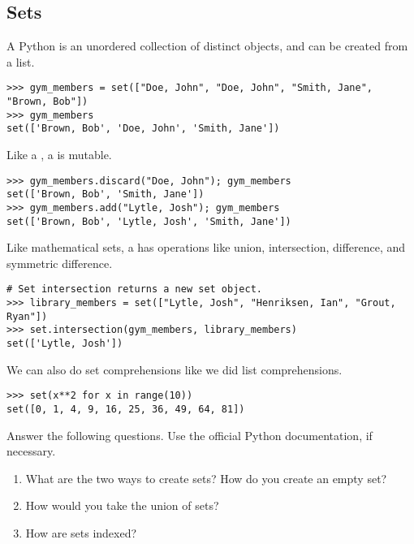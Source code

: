 \subsection*{Sets}
\begin{example}
A Python  is an unordered collection of distinct objects, and can be created from a list.
\begin{lstlisting}
>>> gym_members = set(["Doe, John", "Doe, John", "Smith, Jane", "Brown, Bob"])
>>> gym_members
set(['Brown, Bob', 'Doe, John', 'Smith, Jane'])
\end{lstlisting}
Like a , a  is mutable. 
\begin{lstlisting}
>>> gym_members.discard("Doe, John"); gym_members
set(['Brown, Bob', 'Smith, Jane'])
>>> gym_members.add("Lytle, Josh"); gym_members
set(['Brown, Bob', 'Lytle, Josh', 'Smith, Jane'])
\end{lstlisting}

Like mathematical sets, a  has operations like union, intersection, 
difference, and symmetric difference.

\begin{lstlisting}
# Set intersection returns a new set object.
>>> library_members = set(["Lytle, Josh", "Henriksen, Ian", "Grout, Ryan"])
>>> set.intersection(gym_members, library_members)
set(['Lytle, Josh'])
\end{lstlisting}

We can also do set comprehensions like we did list comprehensions.
\begin{lstlisting}
>>> set(x**2 for x in range(10))
set([0, 1, 4, 9, 16, 25, 36, 49, 64, 81])
\end{lstlisting}
\end{example}

\begin{problem}
Answer the following questions. Use the official Python documentation, if necessary.
\begin{enumerate}
\item What are the two ways to create sets? How do you create an empty set?
\item How would you take the union of sets?
\item How are sets indexed?
\end{enumerate}
\end{problem}

